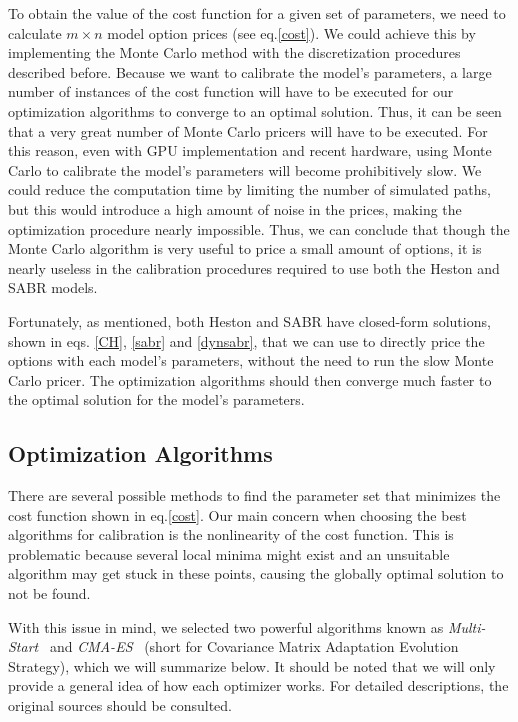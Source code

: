 To obtain the value of the cost function for a given set of parameters, we need to calculate $m\times n$ model option prices (see eq.\eqref{cost}). We could achieve this by implementing the Monte Carlo method with the discretization procedures described before.
Because we want to calibrate the model's parameters, a large number of instances of the cost function will have to be executed for our optimization algorithms to converge to an optimal solution.
Thus, it can be seen that a very great number of Monte Carlo pricers will have to be executed. For this reason, even with GPU implementation and recent hardware, using Monte Carlo to calibrate the model's parameters will become prohibitively slow. We could reduce the computation time by limiting the number of simulated paths, but this would introduce a high amount of noise in the prices, making the optimization procedure nearly impossible.
Thus, we can conclude that though the Monte Carlo algorithm is very useful to price a small amount of options, it is nearly useless in the calibration procedures required to use both the Heston and SABR models.


Fortunately, as mentioned, both Heston and SABR have closed-form solutions, shown in eqs. \eqref{CH}, \eqref{sabr} and \eqref{dynsabr}, that we can use to directly price the options with each model's parameters, without the need to run the slow Monte Carlo pricer. The optimization algorithms should then converge much faster to the optimal solution for the model's parameters.






\subsection{Optimization Algorithms}
There are several possible methods to find the parameter set that minimizes the cost function shown in eq.\eqref{cost}.
Our main concern when choosing the best algorithms for calibration is the nonlinearity of the cost function. This is problematic because several local minima might exist and an unsuitable algorithm may get stuck in these points, causing the globally optimal solution to not be found.

With this issue in mind, we selected two powerful algorithms known as \emph{Multi-Start}~\cite{Ugray} and \emph{CMA-ES}~\cite{Hansen2} (short for Covariance Matrix Adaptation Evolution Strategy), which we will summarize below. It should be noted that we will only provide a general idea of how each optimizer works. For detailed descriptions, the original sources should be consulted.

